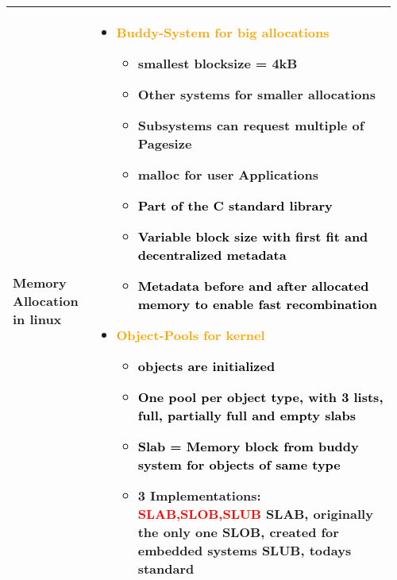 \documentclass[main.tex,fontsize=8pt,paper=a4,paper=portrait,DIV=calc,]{scrartcl}
\begin{document}
\begin{table}[ht!]
\begin{tabular}{|m{0.2\linewidth}|m{0.755\linewidth}|}
\hline
Memory Allocation in linux &
\vspace{2mm}
\begin{itemize}
\item \textcolor{orange}{Buddy-System for big allocations}\newline
  \begin{itemize}
\item smallest blocksize = 4kB
\item Other systems for smaller allocations
\item Subsystems can request multiple of Pagesize
\item malloc for user Applications
  \end{itemize} 
  \begin{itemize}
  \item \textcolor{black}{Part of the C standard library}
  \item \textcolor{black}{Variable block size with first fit and decentralized metadata}
  \item \textcolor{black}{Metadata before and after allocated memory to enable fast recombination}
  \end{itemize}
\item \textcolor{orange}{Object-Pools for kernel}\newline
\begin{itemize}
\item \textcolor{black}{objects are initialized}
\item \textcolor{black}{One pool per object type, with 3 lists, \newline
  full, partially full and empty slabs}
\item \textcolor{black}{Slab = Memory block from buddy system for objects of same type}
\item 3 Implementations: \textbf{\textcolor{red}{SLAB,SLOB,SLUB}}\newline
  SLAB, originally the only one\newline
  SLOB, created for embedded systems\newline
  SLUB, todays standard
\end{itemize} 
\vspace{-3mm}
\end{itemize} 
\\
\hline
\end{tabular}
\end{table}
\pagebreak
\end{document}
